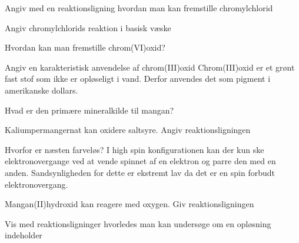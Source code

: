 \begin{flashcard}[Fremstilling]{Angiv med en reaktionsligning hvordan man kan fremstille chromylchlorid}
\end{flashcard}

\begin{flashcard}[Reaktion]{Angiv chromylchlorids reaktion i basisk væske}
\end{flashcard}

\begin{flashcard}[Fremstilling]{Hvordan kan man fremstille chrom(VI)oxid?}
\\\vspace*{0.5cm}
\end{flashcard}

\begin{flashcard}[Anvendelse]{Angiv en karakteristisk anvendelse af chrom(III)oxid}
Chrom(III)oxid er et grønt fast stof som ikke er opløseligt i vand. Derfor anvendes det som pigment i amerikanske dollars.
\end{flashcard}

\begin{flashcard}[Egenskab]{Hvad er den primære mineralkilde til mangan?}
\end{flashcard}

\begin{flashcard}[Reaktion]{Kaliumpermangernat kan oxidere saltsyre. Angiv reaktionsligningen}
\end{flashcard}

\begin{flashcard}[Egenskab]{Hvorfor er  næsten farveløs?}
I high spin konfigurationen kan der kun ske elektronovergange ved at vende spinnet af en elektron og parre den med en anden. Sandsynligheden for dette er ekstremt lav da det er en spin forbudt elektronovergang.
\end{flashcard}

\begin{flashcard}[Reaktion]{Mangan(II)hydroxid kan reagere med oxygen. Giv reaktionsligningen}
\end{flashcard}

\begin{flashcard}[Reaktion]{Vis med reaktionsligninger hvorledes man kan undersøge om en opløsning indeholder }
\end{flashcard}


